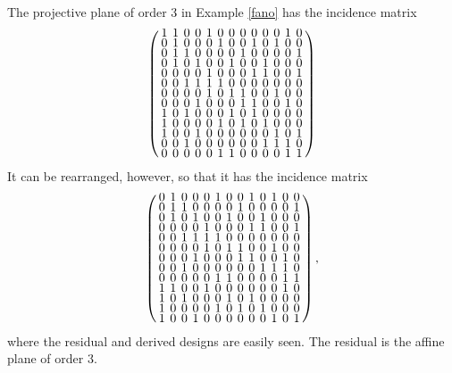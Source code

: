 \documentclass[../../../main]{subfiles}
\begin{document}
\begin{ex}
 The projective plane of order 3 in Example \ref{fano} has the incidence matrix
 \begin{equation}\label{fano-incidence-matrix}
 \arraycolsep=2.0pt\def\arraystretch{0.5}
  \left(\begin{array}{ccccccccccccc}
1 & 1 & 0 & 0 & 1 & 0 & 0 & 0 & 0 & 0 & 0 & 1 & 0 \\
0 & 1 & 0 & 0 & 0 & 1 & 0 & 0 & 1 & 0 & 1 & 0 & 0 \\
0 & 1 & 1 & 0 & 0 & 0 & 0 & 1 & 0 & 0 & 0 & 0 & 1 \\
0 & 1 & 0 & 1 & 0 & 0 & 1 & 0 & 0 & 1 & 0 & 0 & 0 \\
0 & 0 & 0 & 0 & 1 & 0 & 0 & 0 & 1 & 1 & 0 & 0 & 1 \\
0 & 0 & 1 & 1 & 1 & 1 & 0 & 0 & 0 & 0 & 0 & 0 & 0 \\
0 & 0 & 0 & 0 & 1 & 0 & 1 & 1 & 0 & 0 & 1 & 0 & 0 \\
0 & 0 & 0 & 1 & 0 & 0 & 0 & 1 & 1 & 0 & 0 & 1 & 0 \\
1 & 0 & 1 & 0 & 0 & 0 & 1 & 0 & 1 & 0 & 0 & 0 & 0 \\
1 & 0 & 0 & 0 & 0 & 1 & 0 & 1 & 0 & 1 & 0 & 0 & 0 \\
1 & 0 & 0 & 1 & 0 & 0 & 0 & 0 & 0 & 0 & 1 & 0 & 1 \\
0 & 0 & 1 & 0 & 0 & 0 & 0 & 0 & 0 & 1 & 1 & 1 & 0 \\
0 & 0 & 0 & 0 & 0 & 1 & 1 & 0 & 0 & 0 & 0 & 1 & 1
  \end{array}\right)
 \end{equation}
 It can be rearranged, however, so that it has the incidence matrix 
 \begin{equation}
 \arraycolsep=2.0pt\def\arraystretch{0.5}
 \left(\begin{array}{ccccccccccccc}
0 & 1 & 0 & 0 & 0 & 1 & 0 & 0 & 1 & 0 & 1 & 0 & 0 \\
0 & 1 & 1 & 0 & 0 & 0 & 0 & 1 & 0 & 0 & 0 & 0 & 1 \\
0 & 1 & 0 & 1 & 0 & 0 & 1 & 0 & 0 & 1 & 0 & 0 & 0 \\
0 & 0 & 0 & 0 & 1 & 0 & 0 & 0 & 1 & 1 & 0 & 0 & 1 \\
0 & 0 & 1 & 1 & 1 & 1 & 0 & 0 & 0 & 0 & 0 & 0 & 0 \\
0 & 0 & 0 & 0 & 1 & 0 & 1 & 1 & 0 & 0 & 1 & 0 & 0 \\
0 & 0 & 0 & 1 & 0 & 0 & 0 & 1 & 1 & 0 & 0 & 1 & 0 \\
0 & 0 & 1 & 0 & 0 & 0 & 0 & 0 & 0 & 1 & 1 & 1 & 0 \\
0 & 0 & 0 & 0 & 0 & 1 & 1 & 0 & 0 & 0 & 0 & 1 & 1 \\
1 & 1 & 0 & 0 & 1 & 0 & 0 & 0 & 0 & 0 & 0 & 1 & 0 \\
1 & 0 & 1 & 0 & 0 & 0 & 1 & 0 & 1 & 0 & 0 & 0 & 0 \\
1 & 0 & 0 & 0 & 0 & 1 & 0 & 1 & 0 & 1 & 0 & 0 & 0 \\
1 & 0 & 0 & 1 & 0 & 0 & 0 & 0 & 0 & 0 & 1 & 0 & 1
 \end{array}\right),
 \end{equation}
 where the residual and derived designs are easily seen. The residual is the affine plane of order 3.
\end{ex}
 
\biblio
\end{document}
